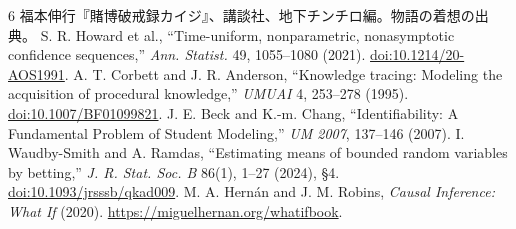 \documentclass[10pt,a4paper]{article}
\begin{document}
\vspace{1mm}

\begin{thebibliography}{6}
\footnotesize\setlength{\itemsep}{0pt}\setlength{\parskip}{0pt}
 福本伸行『賭博破戒録カイジ』、講談社、地下チンチロ編。物語の着想の出典。
 S. R. Howard et al., ``Time-uniform, nonparametric, nonasymptotic confidence sequences,'' \textit{Ann. Statist.} 49, 1055--1080 (2021). \href{https://doi.org/10.1214/20-AOS1991}{doi:10.1214/20-AOS1991}.
 A. T. Corbett and J. R. Anderson, ``Knowledge tracing: Modeling the acquisition of procedural knowledge,'' \textit{UMUAI} 4, 253--278 (1995). \href{https://doi.org/10.1007/BF01099821}{doi:10.1007/BF01099821}.
 J. E. Beck and K.-m. Chang, ``Identifiability: A Fundamental Problem of Student Modeling,'' \textit{UM 2007}, 137--146 (2007).
 I. Waudby-Smith and A. Ramdas, ``Estimating means of bounded random variables by betting,'' \textit{J. R. Stat. Soc. B} 86(1), 1--27 (2024), §4. \href{https://doi.org/10.1093/jrsssb/qkad009}{doi:10.1093/jrsssb/qkad009}.
 M. A. Hern\'an and J. M. Robins, \textit{Causal Inference: What If} (2020). \url{https://miguelhernan.org/whatifbook}.
\end{thebibliography}
\end{document}
